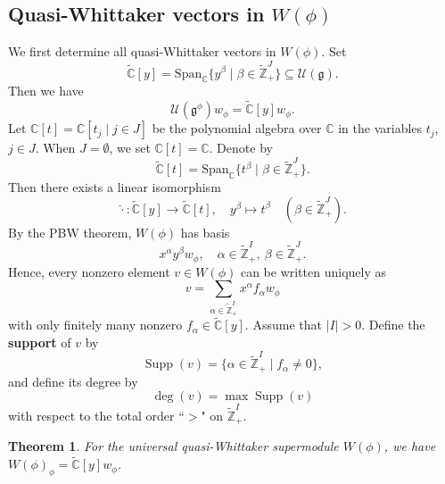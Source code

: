 \documentclass[12pt,reqno]{article}
\newtheorem{thm}{Theorem}[section]
\DeclareMathOperator{\Supp}{Supp}
\def\a{\alpha}
\def\b{\beta}
\def\F{\mathfrak}
\def\r{\mathrm}
\def\C{\mathcal}
\def\CC{\mathbb{C}}
\def\ZZ{\mathbb{Z}}
\def\beqn{\begin{equation*}}
\def\eeqn{\end{equation*}}
\def\beq{\begin{equation}}
\def\eeq{\end{equation}}
\begin{document}
\subsection{Quasi-Whittaker vectors in $W(\phi)$}

We first determine all quasi-Whittaker vectors in $W(\phi)$. Set
\beqn
\widetilde{\CC}[y]=\r{Span}_{\CC}\{y^\b\mid\b\in\widetilde{\ZZ}_+^J\}\subseteq\C{U}(\F{g}).
\eeqn
Then we have 
\beq\label{F3.1}
\C{U}(\F{g}^\phi)w_{\phi}=\widetilde{\CC}[y]w_{\phi}. 
\eeq
Let $\CC[t]=\CC[t_j\mid j\in J]$ be the polynomial algebra over $\CC$ in the variables $t_j$, $j\in J$. When $J=\emptyset$, we set $\CC[t]=\CC$.
 Denote by
\beqn
\widetilde{\CC}[t]=\r{Span}_{\CC}\{t^\b\mid \b\in\widetilde{\ZZ}_+^J\}.
\eeqn
Then there exists a linear isomorphism
\beq
\hat{\cdot }\colon \widetilde{\CC}[y]\rightarrow \widetilde{\CC}[t], \quad y^\beta\mapsto t^\beta \quad (\beta\in\widetilde{\ZZ}_{+}^J).
\eeq
By the PBW theorem, $W(\phi)$ has basis
\beqn
x^{\a}y^{\b}w_{\phi}, \quad\a\in\widetilde{\ZZ}_{+}^{I}, ~\b\in\widetilde{\ZZ}_{+}^{J}.
\eeqn
Hence, every nonzero element $v\in W(\phi)$ can be written uniquely as
\beq
v=\sum_{\a\in\widetilde{\ZZ}_{+}^{I}}x^{\a}f_{\a}w_{\phi}
\eeq
with only finitely many nonzero $f_{\a}\in\widetilde{\CC}[y]$. Assume that $|I|>0$. Define the {\bf support} of $v$ by
\beqn
\Supp(v)=\lbrace\a\in\widetilde{\ZZ}_{+}^{I}\mid f_{\a}\neq0\rbrace,
\eeqn
and define its degree by
\beqn
\deg(v)=\max\Supp(v)
\eeqn
with respect to the total order ``$>$" on $\widetilde{\ZZ}_{+}^{I}$.

\begin{thm}\label{T3.1}
For the universal quasi-Whittaker supermodule $W(\phi)$, we have
$W(\phi)_\phi=\widetilde{\CC}[y]w_\phi$.
\end{thm}
\end{document}
